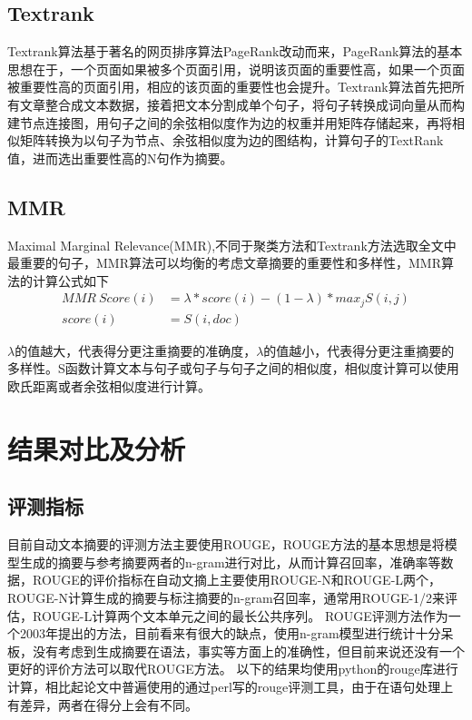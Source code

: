\documentclass[10pt,twocolumn,letterpaper]{article}
\begin{document}
	\subsection{Textrank}
	Textrank算法基于著名的网页排序算法PageRank改动而来，PageRank算法的基本思想在于，一个页面如果被多个页面引用，说明该页面的重要性高，如果一个页面被重要性高的页面引用，相应的该页面的重要性也会提升。Textrank算法首先把所有文章整合成文本数据，接着把文本分割成单个句子，将句子转换成词向量从而构建节点连接图，用句子之间的余弦相似度作为边的权重并用矩阵存储起来，再将相似矩阵转换为以句子为节点、余弦相似度为边的图结构，计算句子的TextRank值，进而选出重要性高的N句作为摘要。


	\subsection{MMR}
	Maximal Marginal Relevance(MMR),不同于聚类方法和Textrank方法选取全文中最重要的句子，MMR算法可以均衡的考虑文章摘要的重要性和多样性，MMR算法的计算公式如下
	\begin{align}
	MMR\ Score(i) &= \lambda*score(i)-(1-\lambda)*max_{j} S(i,j) \\
	score(i) &= S(i,doc)
	\end{align}
	
	$\lambda$的值越大，代表得分更注重摘要的准确度，$\lambda$的值越小，代表得分更注重摘要的多样性。S函数计算文本与句子或句子与句子之间的相似度，相似度计算可以使用欧氏距离或者余弦相似度进行计算。
	
	\section{结果对比及分析}
	
	\subsection{评测指标}
	目前自动文本摘要的评测方法主要使用ROUGE\cite{lin2003automatic}，ROUGE方法的基本思想是将模型生成的摘要与参考摘要两者的n-gram进行对比，从而计算召回率，准确率等数据，ROUGE的评价指标在自动文摘上主要使用ROUGE-N和ROUGE-L两个，ROUGE-N计算生成的摘要与标注摘要的n-gram召回率，通常用ROUGE-1/2来评估，ROUGE-L计算两个文本单元之间的最长公共序列。
	ROUGE评测方法作为一个2003年提出的方法，目前看来有很大的缺点，使用n-gram模型进行统计十分呆板，没有考虑到生成摘要在语法，事实等方面上的准确性，但目前来说还没有一个更好的评价方法可以取代ROUGE方法。
	以下的结果均使用python的rouge库进行计算，相比起论文中普遍使用的通过perl写的rouge评测工具，由于在语句处理上有差异，两者在得分上会有不同。
\end{document}
